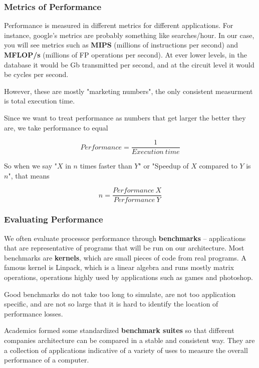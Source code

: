 \documentclass{article}
\begin{document}
\subsubsection{Metrics of Performance}

Performance is measured in different metrics for different applications. For instance, google's metrics are probably something like searches/hour. In our case, you will see metrics such as \textbf{MIPS} (millions of instructions per second) and \textbf{MFLOP/s} (millions of FP operations per second). At ever lower levels, in the database it would be Gb transmitted per second, and at the circuit level it would be cycles per second.

However, these are mostly "marketing numbers", the only consistent measurment is total execution time.

Since we want to treat performance as numbers that get larger the better they are, we take performance to equal

\begin{equation}
Performance = \frac{1}{Execution\ time}
\end{equation}

So when we say "$X$ in $n$ times faster than $Y$" or "Speedup of $X$ compared to $Y$ is $n$", that means

\begin{equation}
n = \frac{Performance\ X}{Performance\ Y}
\end{equation}

\subsubsection{Evaluating Performance}

We often evaluate processor performance through \textbf{benchmarks} -- applications that are representative of programs that will be run on our architecture. Most benchmarks are \textbf{kernels}, which are small pieces of code from real programs. A famous kernel is Linpack, which is a linear algebra and runs mostly matrix operations, operations highly used by applications such as games and photoshop.

Good benchmarks do not take too long to simulate, are not too application specific, and are not so large that it is hard to identify the location of performance losses.

Academics formed some standardized \textbf{benchmark suites} so that different companies architecture can be compared in a stable and consistent way. They are a collection of applications indicative of a variety of uses to measure the overall performance of a computer.
\end{document}
